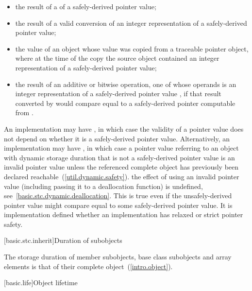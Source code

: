 \begin{itemize}
\item the result of a  of a safely-derived pointer value;

\item the result of a valid conversion of an integer representation of a safely-derived
pointer value;

\item the value of an object whose value was copied from a traceable pointer object,
where at the time of the copy the source object contained an integer representation of a
safely-derived pointer value;

\item the result of an additive or bitwise operation, one of whose operands is an
integer representation of a safely-derived pointer value , if that result
converted by  would compare equal to a safely-derived
pointer computable from .
\end{itemize}

\pnum
An implementation may have , in which case the
validity of a pointer value does not depend on whether it is a safely-derived
pointer value. Alternatively, an implementation may have , in which case a pointer value referring to an object with dynamic
storage duration that is not a safely-derived pointer
value is an invalid pointer value unless
the referenced complete object has previously been declared
reachable~(\ref{util.dynamic.safety}). \enternote
the effect of using an invalid pointer value (including passing it to a
deallocation function) is undefined, see~\ref{basic.stc.dynamic.deallocation}.
This is true even if the unsafely-derived pointer value might compare equal to
some safely-derived pointer value. \exitnote It is implementation
defined whether an implementation has relaxed or strict pointer safety.%
%

[basic.stc.inherit]{Duration of subobjects}

\pnum
{}%
The storage duration of member subobjects, base class subobjects and
array elements is that of their complete object~(\ref{intro.object}).
%

[basic.life]{Object lifetime}

